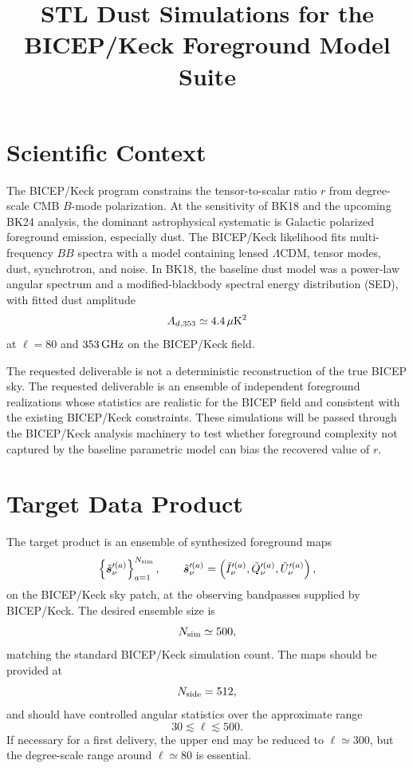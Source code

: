\documentclass[11pt]{article}
\title{STL Dust Simulations for the BICEP/Keck Foreground Model Suite}
\author{}
\date{}
\begin{document}
\maketitle

\section{Scientific Context}

The BICEP/Keck program constrains the tensor-to-scalar ratio $r$ from
degree-scale CMB $B$-mode polarization.  At the sensitivity of BK18 and the
upcoming BK24 analysis, the dominant astrophysical systematic is Galactic
polarized foreground emission, especially dust.  The BICEP/Keck likelihood
fits multi-frequency $BB$ spectra with a model containing lensed $\Lambda$CDM,
tensor modes, dust, synchrotron, and noise.  In BK18, the baseline dust model
was a power-law angular spectrum and a modified-blackbody spectral energy
distribution (SED), with fitted dust amplitude
\[
  A_{d,353} \simeq 4.4\,\mu{\rm K}^2
\]
at $\ell=80$ and $353\,{\rm GHz}$ on the BICEP/Keck field.

The requested deliverable is not a deterministic reconstruction of the true
BICEP sky.  The requested deliverable is an ensemble of independent foreground
realizations whose statistics are realistic for the BICEP field and consistent
with the existing BICEP/Keck constraints.  These simulations will be passed
through the BICEP/Keck analysis machinery to test whether foreground complexity
not captured by the baseline parametric model can bias the recovered value of
$r$.

\section{Target Data Product}

The target product is an ensemble of synthesized foreground maps
\[
  \left\{
    \tilde{\bm s}_{\nu}^{\prime(a)}
  \right\}_{a=1}^{N_{\rm sim}},
  \qquad
  \tilde{\bm s}_{\nu}^{\prime(a)}
  =
  \left(\tilde I_\nu^{\prime(a)},
        \tilde Q_\nu^{\prime(a)},
        \tilde U_\nu^{\prime(a)}\right),
\]
on the BICEP/Keck sky patch, at the observing bandpasses supplied by
BICEP/Keck.  The desired ensemble size is
\[
  N_{\rm sim}\simeq 500,
\]
matching the standard BICEP/Keck simulation count.  The maps should be
provided at
\[
  N_{\rm side}=512,
\]
and should have controlled angular statistics over the approximate range
\[
  30 \lesssim \ell \lesssim 500.
\]
If necessary for a first delivery, the upper end may be reduced to
$\ell\simeq 300$, but the degree-scale range around $\ell\simeq 80$ is
essential.
\end{document}
